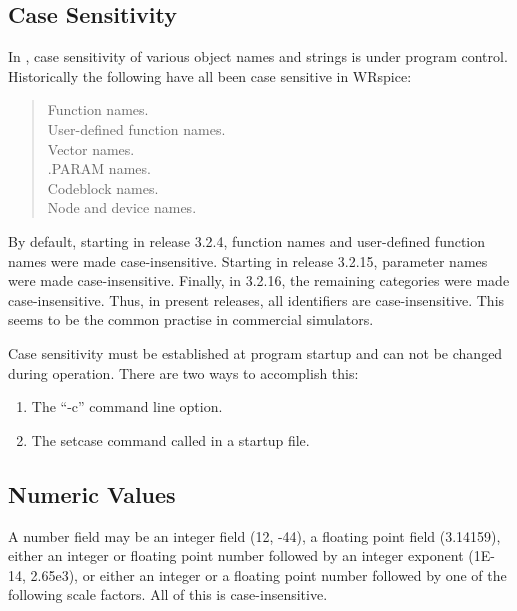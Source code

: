 \subsection{Case Sensitivity}
In {\WRspice}, case sensitivity of various object names and strings is
under program control.  Historically the following have all been case
sensitive in WRspice:

\begin{quote}
Function names.\\
User-defined function names.\\
Vector names.\\
.PARAM names.\\
Codeblock names.\\
Node and device names.\\
\end{quote}

By default, starting in release 3.2.4, function names and user-defined
function names were made case-insensitive.  Starting in release
3.2.15, parameter names were made case-insensitive.  Finally, in
3.2.16, the remaining categories were made case-insensitive.  Thus, in
present releases, all identifiers are case-insensitive.  This seems to
be the common practise in commercial simulators.

Case sensitivity must be established at program startup and can not be
changed during operation.  There are two ways to accomplish this:

\begin{enumerate}
\item{The ``{\vt -c}'' command line option.}
\item{The {\cb setcase} command called in a startup file.}
\end{enumerate}

\subsection{Numeric Values}
\label{number}

A number field may be an integer field (12, -44), a
floating point field (3.14159), either an integer or floating point
number followed by an integer exponent (1E-14, 2.65e3), or either an
integer or a floating point number followed by one of the following
scale factors.  All of this is case-insensitive.

